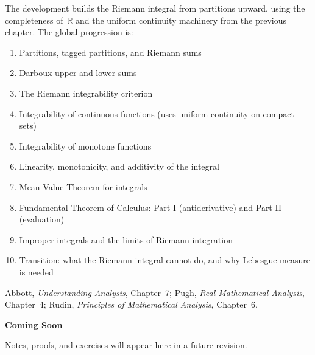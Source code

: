 The development builds the Riemann integral from partitions
upward, using the completeness of~$\mathbb{R}$ and the
uniform continuity machinery from the previous chapter.
The global progression is:

\begin{enumerate}
  \item Partitions, tagged partitions, and Riemann sums
  \item Darboux upper and lower sums
  \item The Riemann integrability criterion
  \item Integrability of continuous functions (uses uniform
        continuity on compact sets)
  \item Integrability of monotone functions
  \item Linearity, monotonicity, and additivity of the integral
  \item Mean Value Theorem for integrals
  \item Fundamental Theorem of Calculus: Part I (antiderivative)
        and Part II (evaluation)
  \item Improper integrals and the limits of Riemann integration
  \item Transition: what the Riemann integral cannot do, and why
        Lebesgue measure is needed
\end{enumerate}

\begin{remark*}
Abbott, \textit{Understanding Analysis}, Chapter~7;
Pugh, \textit{Real Mathematical Analysis}, Chapter~4;
Rudin, \textit{Principles of Mathematical Analysis}, Chapter~6.
\end{remark*}

\vspace{1em}
\begin{tcolorbox}[
  colback=gray!6, colframe=gray!40, arc=2pt,
  left=8pt, right=8pt, top=6pt, bottom=6pt,
  title={\small\textbf{Status: Planned}},
  fonttitle=\small\bfseries
]
\begin{center}\Large\bfseries Coming Soon\end{center}
\vspace{6pt}
\noindent Notes, proofs, and exercises will appear here in a future revision.
\end{tcolorbox}

% 
% 
% 
% 
% 
% 
